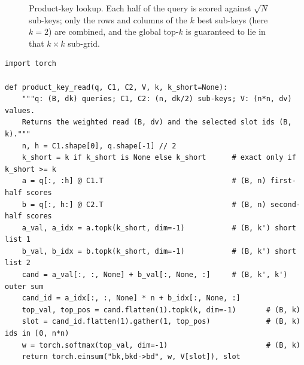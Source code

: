 \begin{figure}[t]
\centering
{}
\caption{Product-key lookup. Each half of the query is scored against $\sqrt{N}$ sub-keys; only the
rows and columns of the $k$ best sub-keys (here $k=2$) are combined, and the global top-$k$ is
guaranteed to lie in that $k \times k$ sub-grid.}
\label{fig:c10-pkm}
\end{figure}

\begin{lstlisting}[caption={Reference implementation (ours): product-key top-$k$ retrieval and read.},label={lst:c10-pkm}]
import torch

def product_key_read(q, C1, C2, V, k, k_short=None):
    """q: (B, dk) queries; C1, C2: (n, dk/2) sub-keys; V: (n*n, dv) values.
    Returns the weighted read (B, dv) and the selected slot ids (B, k)."""
    n, h = C1.shape[0], q.shape[-1] // 2
    k_short = k if k_short is None else k_short      # exact only if k_short >= k
    a = q[:, :h] @ C1.T                              # (B, n) first-half scores
    b = q[:, h:] @ C2.T                              # (B, n) second-half scores
    a_val, a_idx = a.topk(k_short, dim=-1)           # (B, k') short list 1
    b_val, b_idx = b.topk(k_short, dim=-1)           # (B, k') short list 2
    cand = a_val[:, :, None] + b_val[:, None, :]     # (B, k', k') outer sum
    cand_id = a_idx[:, :, None] * n + b_idx[:, None, :]
    top_val, top_pos = cand.flatten(1).topk(k, dim=-1)       # (B, k)
    slot = cand_id.flatten(1).gather(1, top_pos)             # (B, k) ids in [0, n*n)
    w = torch.softmax(top_val, dim=-1)                       # (B, k)
    return torch.einsum("bk,bkd->bd", w, V[slot]), slot
\end{lstlisting}

